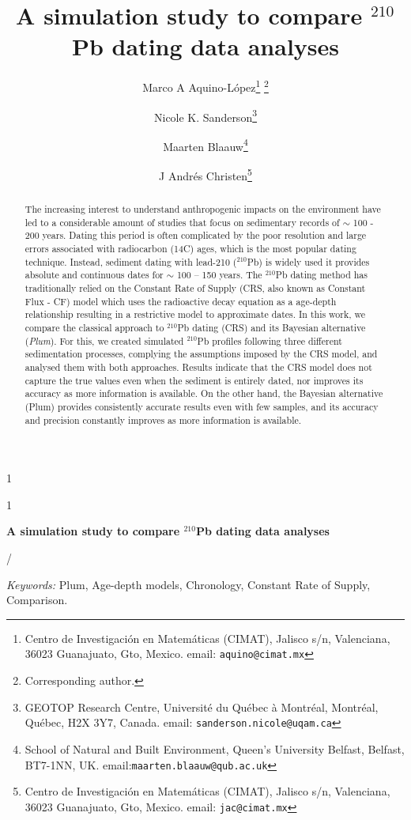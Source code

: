 \documentclass [10pt] {article}
\date{ }
\newcommand{\blind}{1}
\newcommand{\papertitle}{
 A simulation study to compare $^{210}$Pb dating data analyses 
}
\begin{document}
	\def\spacingset#1{\renewcommand{\baselinestretch}%
		{#1}\small\normalsize} \spacingset{1}
	\blind
	{
		\title{\textbf{\papertitle}}

		\author{Marco A Aquino-L\'opez\thanks{
				Centro de Investigaci\'on en Matem\'aticas (CIMAT),
				Jalisco s/n, Valenciana, 36023 Guanajuato, Gto, Mexico.
				email: \texttt{aquino@cimat.mx} } \thanks{Corresponding author.}
					\and
			Nicole K. Sanderson\thanks{
				GEOTOP Research Centre, Université du Québec à Montréal, 
				Montréal, Québec, H2X 3Y7, Canada. 
				email: \texttt{sanderson.nicole@uqam.ca}}
					\and
			Maarten Blaauw\thanks{School of Natural and Built Environment,
				Queen's University Belfast,
				Belfast, BT7-1NN, UK.
				email:\texttt{maarten.blaauw@qub.ac.uk}  }
					\and
			J Andr\'es Christen\thanks{
				Centro de Investigaci\'on en Matem\'aticas (CIMAT),
				Jalisco s/n, Valenciana, 36023 Guanajuato, Gto, Mexico.
				email: \texttt{jac@cimat.mx}  }
			}
		\maketitle
	} \fi

	\blind
	{
		\bigskip
		\bigskip
		\bigskip
		\begin{center}
			{\LARGE\bf \papertitle}
		\end{center}
		\medskip/
	} \fi

	\bigskip
\begin{abstract}
	The increasing interest to understand anthropogenic impacts on the environment have led to a considerable amount of studies that focus on sedimentary records of $\sim$ 100 - 200 years. Dating this period is often complicated by the poor resolution and large errors associated with radiocarbon (14C) ages, which is the most popular dating technique. Instead, sediment dating with lead-210 ($^210$Pb) is widely used it provides absolute and continuous dates for $\sim$ 100 – 150 years. The $^210$Pb dating method has traditionally relied on the Constant Rate of Supply (CRS, also known as Constant Flux - CF) model which uses the radioactive decay equation as a age-depth relationship resulting in a restrictive model to approximate dates. In this work, we compare the classical approach to $^210$Pb dating (CRS) and its Bayesian alternative (\textit{Plum}). For this, we created simulated $^210$Pb profiles following three different sedimentation processes, complying the assumptions imposed by the CRS model, and analysed them with both approaches. Results indicate that the CRS model does not capture the true values even when the sediment is entirely dated, nor improves its accuracy as more information is available. On the other hand, the Bayesian alternative (Plum) provides consistently accurate results even with few samples, and its accuracy and precision constantly improves as more information is available.
\end{abstract}
	\noindent%
	{\it Keywords:} Plum, Age-depth models, Chronology, Constant Rate of Supply, Comparison.
	\vfill
	\newpage
	\spacingset{1.45} %
\end{document}

